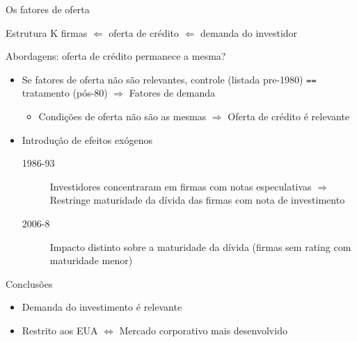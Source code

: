 \documentclass[presentation]{beamer}
\begin{document}
\begin{frame}[label={sec:org475f662},fragile]{Os fatores de oferta}
 \begin{center}
Estrutura K firmas \(\Leftarrow\) oferta de crédito \(\Leftarrow\) demanda do investidor
\end{center}

\begin{block}{Abordagens: oferta de crédito permanece a mesma?}
\begin{itemize}
\item Se fatores de oferta não são relevantes, controle (listada pre-1980) \texttt{==}  tratamento (pós-80) \(\Rightarrow\) Fatores de demanda
\begin{itemize}
\item Condições de oferta não são as mesmas \(\Rightarrow\) Oferta de crédito é relevante
\end{itemize}
\item Introdução de efeitos exógenos
\begin{description}
\item[{1986-93}] Investidores concentraram em firmas com notas especulativas \(\Rightarrow\) Restringe maturidade da dívida das firmas com nota de investimento
\item[{2006-8}] Impacto distinto sobre a maturidade da dívida (firmas sem rating com maturidade menor)
\end{description}
\end{itemize}
\end{block}

\begin{block}{Conclusões}
\begin{itemize}
\item Demanda do investimento é relevante
\item Restrito aos EUA \(\Leftrightarrow\) Mercado corporativo mais desenvolvido
\end{itemize}
\end{block}
\end{frame}
\end{document}
